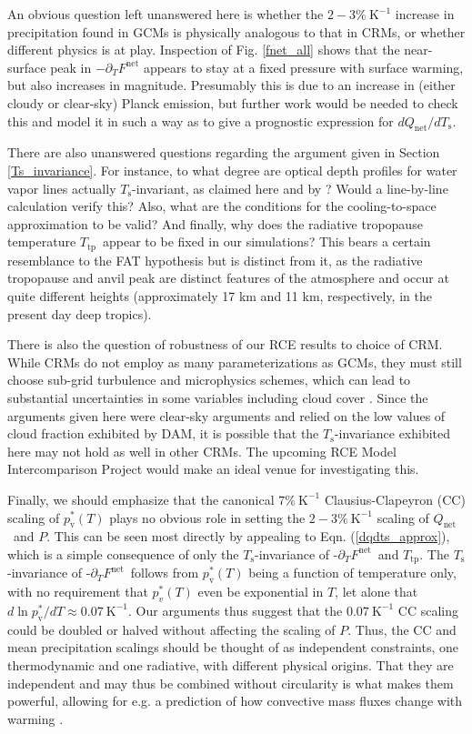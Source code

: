 \documentclass[9pt,twocolumn,twoside,lineno]{pnas-new}
\newcommand{\eqnref}[1]{(\ref{#1})}
\newcommand{\ppt}{\ensuremath{\partial_T}}
\newcommand{\Qnet}{\ensuremath{Q_\mathrm{net}}}
\newcommand{\Fnet}{\ensuremath{F^\mathrm{net}}}
\newcommand{\pvstar}{\ensuremath{p^*_{\mathrm{v}}}}
\newcommand{\Ts}{\ensuremath{T_\mathrm{s}}}
\newcommand{\Ttp}{\ensuremath{T_\mathrm{tp}}}
\newcommand{\Kinverse}{\ensuremath{\mathrm{K^{-1}}}}
\begin{document}
An obvious question left unanswered here is whether the $2 -3\%\ \Kinverse$ increase in precipitation found in GCMs is  physically analogous to that in CRMs, or whether different physics is at play. Inspection of Fig. \ref{fnet_all} shows that the near-surface peak in $-\ppt \Fnet$ appears to stay at a fixed pressure with surface warming, but also increases in magnitude. 
Presumably this is due to an increase in (either cloudy or clear-sky) Planck emission, but further work would be needed to check this and model it in such a way as to give a prognostic expression for $d\Qnet/d\Ts$. 

There are also unanswered questions regarding the  argument given in Section \ref{Ts_invariance}. For instance, to what degree are optical depth profiles for water vapor lines actually \Ts-invariant, as claimed here and by \cite{ingram2010}? Would a line-by-line calculation verify this?  Also, what are the conditions for the cooling-to-space approximation to be valid? And finally, why does  the radiative tropopause temperature \Ttp\ appear to be fixed in our simulations? This bears a certain resemblance to the FAT hypothesis but is distinct from it, as the radiative tropopause and anvil peak are distinct features of the atmosphere and occur at quite different heights (approximately 17 km and 11 km, respectively, in the present day deep tropics).

There is also the question of robustness of our RCE results to choice of CRM. While CRMs do not employ as many parameterizations as GCMs, they must still choose sub-grid turbulence and microphysics schemes, which can lead to substantial uncertainties in some variables including cloud cover \cite[e.g.][]{tsushima2015, igel2014}. Since the arguments given here were clear-sky arguments and relied on the low values of  cloud fraction exhibited by DAM, it is possible that the \Ts-invariance exhibited here may not hold as well in other CRMs. The upcoming RCE Model Intercomparison Project \cite[RCEMIP,][]{wing2017b} would make an ideal venue for investigating this.

Finally, we should emphasize that the canonical $7\%\ \Kinverse$ Clausius-Clapeyron (CC) scaling of $\pvstar(T)$ plays no obvious role in setting the $2 -3\%\ \Kinverse$  scaling of \Qnet\ and $P$. This can be seen most directly by appealing to Eqn. \eqnref{dqdts_approx}, which is a simple consequence of only the \Ts-invariance of -\ppt \Fnet\ and \Ttp. The \Ts-invariance of -\ppt \Fnet\  follows from  $\pvstar(T)$ being a function of temperature only, with no requirement that $p_v^*(T)$ even be exponential in $T$, let alone that $d\ln \pvstar/dT \approx 0.07 \ \Kinverse$.  Our arguments thus suggest that the $0.07 \ \Kinverse$ CC scaling  could be doubled or halved without affecting the scaling of $P$. Thus, the CC and mean precipitation scalings should be thought of as independent constraints, one thermodynamic and one radiative, with different physical origins. That they are independent and may thus be combined without circularity is what makes them powerful, allowing for e.g. a prediction of how convective mass fluxes change with warming \cite[][]{held2006}.
\end{document}
